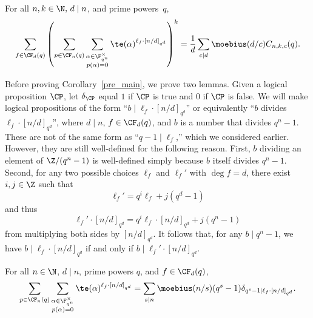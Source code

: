 \begin{corollary}
\label{pre_main}
For all \(n,k \in \N, \, d \mid n\), and prime powers~\(q\),
\[
\sum_{f \in \CF_d (q)}
\left (
\sum_{p \in \CF_n (q)}
\sum_{\substack{\alpha \in \F_{q^n}^\times \\ p(\alpha) = 0}}
\te(\alpha)^{\ell_f \cdot [n/d]_{q^d}}
\right )^k
=
\frac{1}{d} \sum_{c \mid d} \moebius(d/c) C_{n,k,c}(q).
\]
\end{corollary}




Before proving Corollary~\ref{pre_main}, we prove two lemmas.
Given a logical proposition \(\CP\), let \(\delta_\CP\) equal \(1\) if \(\CP\) is true and \(0\) if \(\CP\) is false.
We will make logical propositions of the form ``\(b \mid \ell_f \cdot [n/d]_{q^d}\)'' or equivalently ``\(b\) divides \(\ell_f \cdot [n/d]_{q^d}\)'', where \(d \mid n\), \(f \in \CF_d (q)\), and \(b\) is a number that divides \(q^n-1\).
These are not of the same form as ``\(q-1 \mid \ell_f\),'' which we considered earlier.
However, they are still well-defined for the following reason.
First, \(b\) dividing an element of \(\Z / (q^n-1)\) is well-defined simply because \(b\) itself divides \(q^n-1\).
Second, for any two possible choices \(\ell_f\) and \(\ell_f'\) with \(\deg f = d\), there exist \(i,j \in \Z\) such that
\begin{equation}
\label{well_defined_div}
\ell_f' = q^i \ell_f + j(q^d-1)
\end{equation}
and thus
\begin{equation}
\ell_f' \cdot [n/d]_{q^d} = q^i \ell_f \cdot [n/d]_{q^d} + j (q^n-1)
\end{equation}
from multiplying both sides by \([n/d]_{q^d}\).
It follows that, for any \(b \mid q^n-1\), we have
\(b \mid \ell_f \cdot [n/d]_{q^d}\)
if and only if
\(b \mid \ell_f' \cdot [n/d]_{q^d}\).



\begin{lemma}
\label{pre_pre_main}
For all \(n \in \N\), \(d \mid n\), prime powers \(q\), and \(f \in \CF_d (q)\),
\begin{equation}
\sum_{p \in \CF_n (q)}
\sum_{\substack{\alpha \in \F_{q^n}^\times \\ p(\alpha) = 0}}
\te(\alpha)^{\ell_f \cdot [n/d]_{q^d}}
=
\sum_{s \mid n} \moebius(n/s) (q^s-1) \delta_{q^s - 1 \mid \ell_f \cdot [n/d]_{q^d}}.
\end{equation}
\end{lemma}



